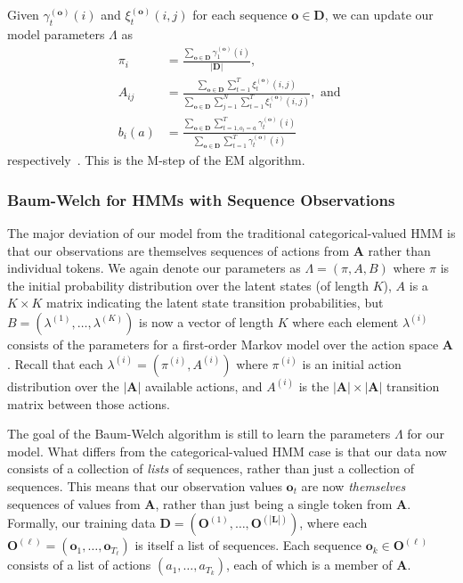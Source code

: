 Given $\gamma^{(\mathbf{o})}_t(i)$ and $\xi^{(\mathbf{o})}_t(i,j)$ for each
sequence $\mathbf{o} \in \mathbf{D}$, we can update our model parameters $\Lambda$
as
\begin{align}
  \pi_i &= \frac{\sum_{\mathbf{o} \in \mathbf{D}}
  \gamma^{(\mathbf{o})}_1(i)}{|\mathbf{D}|},\\
  A_{ij} &= \frac{\sum_{\mathbf{o} \in \mathbf{D}} \sum_{t=1}^T
  \xi^{(\mathbf{o})}_t(i,j)} {\sum_{\mathbf{o} \in \mathbf{D}} \sum_{j=1}^N
  \sum_{t=1}^T \xi^{(\mathbf{o})}_t(i,j)},
  \text{ and }\\
  b_i(a) &= \frac{\sum_{\mathbf{o} \in \mathbf{D}} \sum_{t=1, o_t = a}^T
  \gamma^{(\mathbf{o})}_t(i)} {\sum_{\mathbf{o} \in \mathbf{D}}
  \sum_{t=1}^T \gamma^{(\mathbf{o})}_t(i)}
\end{align}
respectively~\cite{Rabiner:1990:RSR}. This is the M-step of the EM
algorithm.

\subsubsection{Baum-Welch for HMMs with Sequence Observations}
The major deviation of our model from the traditional categorical-valued
HMM is that our observations are themselves sequences of actions from
$\mathbf{A}$ rather than individual tokens. We again denote our parameters
as $\Lambda = (\pi, A, B)$ where $\pi$ is the initial probability
distribution over the latent states (of length $K$), $A$ is a $K \times K$
matrix indicating the latent state transition probabilities, but $B =
(\lambda^{(1)}, \ldots, \lambda^{(K)})$ is now a vector of length $K$ where
each element $\lambda^{(i)}$ consists of the parameters for a first-order
Markov model over the action space $\mathbf{A}$. Recall that each
$\lambda^{(i)} = (\pi^{(i)}, A^{(i)})$ where $\pi^{(i)}$ is an initial
action distribution over the $|\mathbf{A}|$ available actions, and
$A^{(i)}$ is the $|\mathbf{A}| \times |\mathbf{A}|$ transition matrix
between those actions.

The goal of the Baum-Welch algorithm is still to learn the parameters
$\Lambda$ for our model. What differs from the categorical-valued HMM case
is that our data now consists of a collection of \emph{lists} of sequences,
rather than just a collection of sequences. This means that our observation
values $\mathbf{o}_t$ are now \emph{themselves} sequences of values from
$\mathbf{A}$, rather than just being a single token from $\mathbf{A}$.
Formally, our training data $\mathbf{D} = (\mathbf{O}^{(1)}, \ldots,
\mathbf{O}^{(|\mathbf{L}|)})$, where each $\mathbf{O}^{(\ell)} = (\mathbf{o}_1,
\ldots, \mathbf{o}_{T_\ell})$ is itself a list of sequences. Each sequence
$\mathbf{o}_k \in \mathbf{O}^{(\ell)}$ consists of a list of actions $(a_1,
\ldots, a_{T_k})$, each of which is a member of $\mathbf{A}$.


